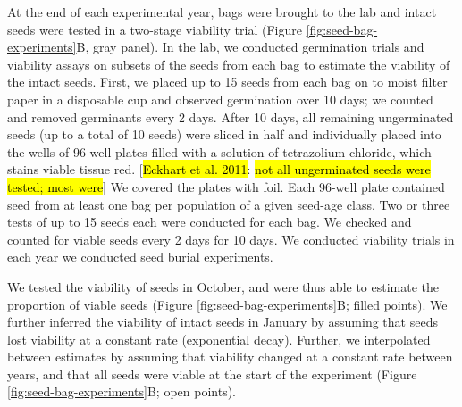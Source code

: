\documentclass[12pt, oneside, titlepage]{article}   	%
\begin{document}
At the end of each experimental year, bags were brought to the lab and intact seeds were tested in a two-stage viability trial (Figure \ref{fig:seed-bag-experiments}B, gray panel). In the lab, we conducted germination trials and viability assays on subsets of the seeds from each bag to estimate the viability of the intact seeds. First, we placed up to 15 seeds from each bag on to moist filter paper in a disposable cup and observed germination over 10 days; we counted and removed germinants every 2 days.  After 10 days, all remaining ungerminated seeds (up to a total of 10 seeds) were sliced in half and individually placed into the wells of 96-well plates filled with a solution of tetrazolium chloride, which stains viable tissue red. [\hl{Eckhart et al. 2011}: \hl{not all ungerminated seeds were tested; most were}] We covered the plates with foil. Each 96-well plate contained seed from at least one bag per population of a given seed-age class. Two or three tests of up to 15 seeds each were conducted for each bag. We checked and counted for viable seeds every 2 days for 10 days. We conducted viability trials in each year we conducted seed burial experiments.

We tested the viability of seeds in October, and were thus able to estimate the proportion of viable seeds (Figure \ref{fig:seed-bag-experiments}B; filled points). We further inferred the viability of intact seeds in January by assuming that seeds lost viability at a constant rate (exponential decay). Further, we interpolated between estimates by assuming that viability changed at a constant rate between years, and that all seeds were viable at the start of the experiment (Figure \ref{fig:seed-bag-experiments}B; open points).
\end{document}
